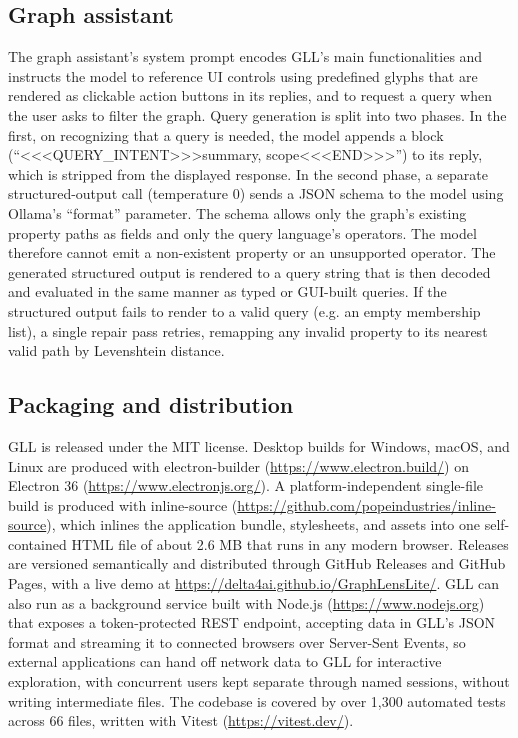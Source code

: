 \subsection{Graph assistant}
The graph assistant's system prompt encodes GLL's main functionalities and instructs the model to reference UI controls using predefined glyphs that are rendered as clickable action buttons in its replies, and to request a query when the user asks to filter the graph. Query generation is split into two phases. In the first, on recognizing that a query is needed, the model appends a block (``<<<QUERY\_INTENT>>>{summary, scope}<<<END>>>'') to its reply, which is stripped from the displayed response. In the second phase, a separate structured-output call (temperature 0) sends a JSON schema to the model using Ollama's ``format'' parameter. The schema allows only the graph's existing property paths as fields and only the query language's operators. The model therefore cannot emit a non-existent property or an unsupported operator. The generated structured output is rendered to a query string that is then decoded and evaluated in the same manner as typed or GUI-built queries. If the structured output fails to render to a valid query (e.g. an empty membership list), a single repair pass retries, remapping any invalid property to its nearest valid path by Levenshtein distance.

\subsection{Packaging and distribution}
GLL is released under the MIT license. Desktop builds for Windows, macOS, and Linux are produced with electron-builder (\url{https://www.electron.build/}) on Electron 36 (\url{https://www.electronjs.org/}). A platform-independent single-file build is produced with inline-source (\url{https://github.com/popeindustries/inline-source}), which inlines the application bundle, stylesheets, and assets into one self-contained HTML file of about 2.6 MB that runs in any modern browser. Releases are versioned semantically and distributed through GitHub Releases and GitHub Pages, with a live demo at  \url{https://delta4ai.github.io/GraphLensLite/}. GLL can also run as a background service built with Node.js (\url{https://www.nodejs.org}) that exposes a token-protected REST endpoint, accepting data in GLL's JSON format and streaming it to connected browsers over Server-Sent Events, so external applications can hand off network data to GLL for interactive exploration, with concurrent users kept separate through named sessions, without writing intermediate files. The codebase is covered by over 1,300 automated tests across 66 files, written with Vitest (\url{https://vitest.dev/}).

